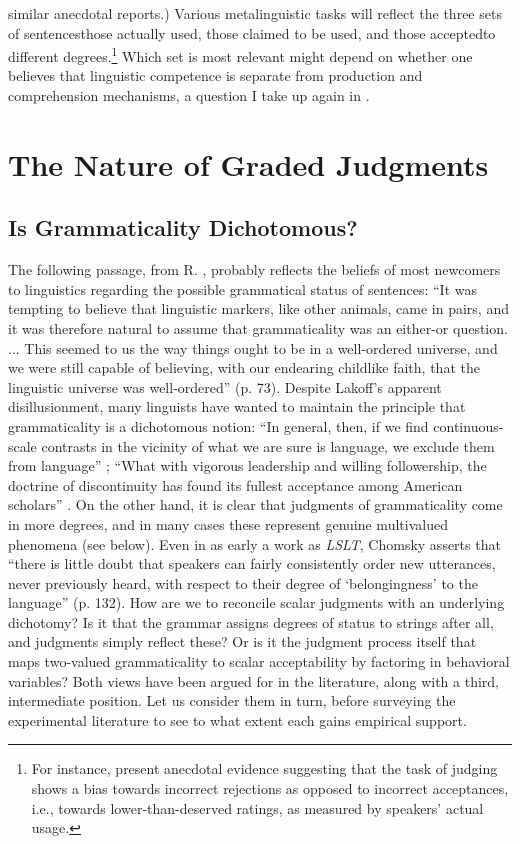 similar anecdotal reports.) Various metalinguistic tasks will reflect the three sets of sentences\schdash{}those actually used, those claimed to be used, and those accepted\schdash{}to different degrees.\footnote{For instance, \citet{HindleEtAl1975} present anecdotal evidence suggesting that the task of judging shows a bias towards incorrect rejections as opposed to incorrect acceptances, i.e., towards lower-than-deserved ratings, as measured by speakers' actual usage.}
Which set is most relevant might depend on whether one believes that linguistic competence is separate from production and comprehension mechanisms, a question I take up again in .

\section{The Nature of Graded Judgments}\label{sec:3.3}
\subsection{Is Grammaticality  Dichotomous?}\label{sec:3.3.1}

The following passage, from R. \citet{Lakoff1977}, probably reflects the beliefs of most newcomers to linguistics regarding the possible grammatical status of sentences: ``It was tempting to believe that linguistic markers, like other animals, came in pairs, and it was therefore natural to assume that grammaticality was an either-or question. ... This seemed to us the way things ought to be in a well-ordered universe, and we were still capable of believing, with our endearing childlike faith, that the linguistic universe was well-ordered'' (p. 73). Despite Lakoff's apparent disillusionment, many linguists have wanted to maintain the principle that grammaticality is a dichotomous notion: ``In general, then, if we find continuous-scale contrasts in the vicinity of what we are sure is language, we exclude them from language'' \citep[17]{Hockett1955}; ``What with vigorous leadership and willing followership, the doctrine of discontinuity has found its fullest acceptance among American scholars'' \citep[2]{Bolinger1961}. On the other hand, it is clear that judgments of grammaticality come in more degrees, and in many cases these represent genuine multivalued phenomena (see below). Even in as early a work as \textit{LSLT}, Chomsky asserts that ``there is little doubt that speakers can fairly consistently order new utterances, never previously heard, with respect to their degree of `belongingness' to the language'' (p. 132). How are we to reconcile scalar judgments with an underlying dichotomy? Is it that the grammar assigns degrees of status to strings after all, and judgments simply reflect these? Or is it the judgment process itself that maps two-valued grammaticality to scalar acceptability by factoring in behavioral variables? Both views have been argued for in the literature, along with a third, intermediate position. Let us consider them in turn, before surveying the experimental literature to see to what extent each gains empirical support.

